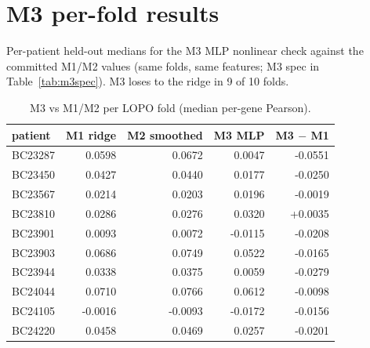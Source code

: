 \section{M3 per-fold results}
Per-patient held-out medians for the M3 MLP nonlinear check against the committed M1/M2 values (same folds, same features; M3 spec in Table~\ref{tab:m3spec}). M3 loses to the ridge in 9 of 10 folds.
\begin{table}[h]\centering\small\caption{M3 vs M1/M2 per LOPO fold (median per-gene Pearson).}\label{tab:m3folds}
\begin{tabular}{lrrrr}\hline\hline patient & M1 ridge & M2 smoothed & M3 MLP & M3 $-$ M1\\\hline
BC23287 & 0.0598 & 0.0672 & 0.0047 & -0.0551\\
BC23450 & 0.0427 & 0.0440 & 0.0177 & -0.0250\\
BC23567 & 0.0214 & 0.0203 & 0.0196 & -0.0019\\
BC23810 & 0.0286 & 0.0276 & 0.0320 & +0.0035\\
BC23901 & 0.0093 & 0.0072 & -0.0115 & -0.0208\\
BC23903 & 0.0686 & 0.0749 & 0.0522 & -0.0165\\
BC23944 & 0.0338 & 0.0375 & 0.0059 & -0.0279\\
BC24044 & 0.0710 & 0.0766 & 0.0612 & -0.0098\\
BC24105 & -0.0016 & -0.0093 & -0.0172 & -0.0156\\
BC24220 & 0.0458 & 0.0469 & 0.0257 & -0.0201\\
\hline\end{tabular}\end{table}
